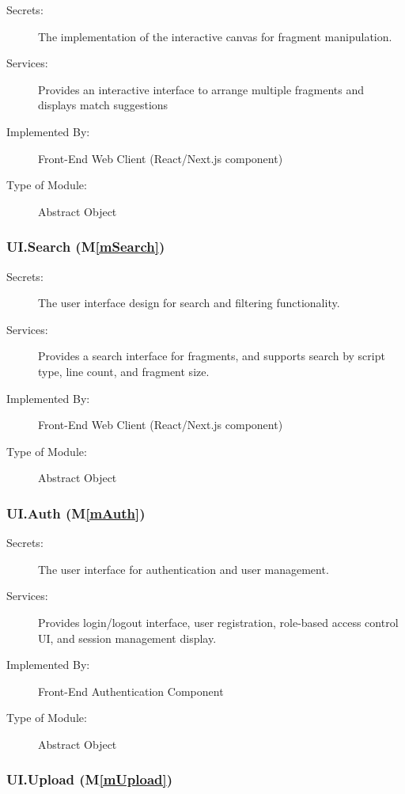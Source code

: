 \documentclass[12pt, titlepage]{article}
\newcommand{\mref}[1]{M\ref{#1}}
\begin{document}
\begin{description}
\item[Secrets:] The implementation of the interactive canvas for fragment manipulation.
\item[Services:] Provides an interactive interface to arrange multiple fragments and displays match suggestions
\item[Implemented By:] Front-End Web Client (React/Next.js component)
\item[Type of Module:] Abstract Object
\end{description}

\subsubsection{UI.Search (\mref{mSearch})}

\begin{description}
\item[Secrets:] The user interface design for search and filtering functionality.
\item[Services:] Provides a search interface for fragments, and supports search by script type, line count, and fragment size.
\item[Implemented By:] Front-End Web Client (React/Next.js component)
\item[Type of Module:] Abstract Object
\end{description}

\subsubsection{UI.Auth (\mref{mAuth})}

\begin{description}
\item[Secrets:] The user interface for authentication and user management.
\item[Services:] Provides login/logout interface, user registration, role-based access control UI, and session management display.
\item[Implemented By:] Front-End Authentication Component
\item[Type of Module:] Abstract Object
\end{description}

\subsubsection{UI.Upload (\mref{mUpload})}
\end{document}
